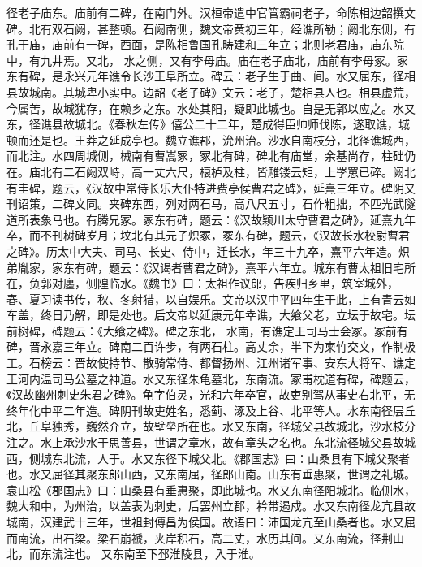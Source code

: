 \documentclass[12pt,UTF8]{ctexbook}
\begin{document}
径老子庙东。庙前有二碑，在南门外。汉桓帝遣中官管霸祠老子，命陈相边韶撰文碑。北有双石阙，甚整顿。石阙南侧，魏文帝黄初三年，经谯所勒；阙北东侧，有孔于庙，庙前有一碑，西面，是陈相鲁国孔畴建和三年立；北则老君庙，庙东院中，有九井焉。又北， 水之侧，又有李母庙。庙在老子庙北，庙前有李母冢。冢东有碑，是永兴元年谯令长沙王阜所立。碑云：老子生于曲、间。水又屈东，径相县故城南。其城卑小实中。边韶《老子碑》文云：老子，楚相县人也。相县虚荒，今属苦，故城犹存，在赖乡之东。水处其阳，疑即此城也。自是无郭以应之。水又东，径谯县故城北。《春秋左传》僖公二十二年，楚成得臣帅师伐陈，遂取谯，城顿而还是也。王莽之延成亭也。魏立谯郡，沇州治。沙水自南枝分，北径谯城西，而北注。水四周城侧，械南有曹嵩冢，冢北有碑，碑北有庙堂，余基尚存，柱础仍在。庙北有二石阙双峙，高一丈六尺，榱栌及柱，皆雕镂云矩，上罦罳已碎。阙北有圭碑，题云，《汉故中常侍长乐大仆特进费亭侯曹君之碑》，延熹三年立。碑阴又刊诏策，二碑文同。夹碑东西，列对两石马，高八尺五寸，石作粗拙，不匹光武隧道所表象马也。有腾兄冢。冢东有碑，题云：《汉故颖川太守曹君之碑》，延熹九年卒，而不刊树碑岁月；坟北有其元子炽冢，冢东有碑，题云，《汉故长水校尉曹君之碑》。历太中大夫、司马、长史、侍中，迁长水，年三十九卒，熹平六年造。炽弟胤家，家东有碑，题云：《汉谒者曹君之碑》，熹平六年立。城东有曹太祖旧宅所在，负郭对廛，侧隍临水。《魏书》曰：太祖作议郎，告疾归乡里，筑室城外，春、夏习读书传，秋、冬射猎，以自娱乐。文帝以汉中平四年生于此，上有青云如车盖，终日乃解，即是处也。后文帝以延康元年幸谯，大飨父老，立坛于故宅。坛前树碑，碑题云：《大飨之碑》。碑之东北， 水南，有谯定王司马士会冢。冢前有碑，晋永嘉三年立。碑南二百许步，有两石柱。高丈余，半下为柬竹交文，作制极工。石榜云：晋故使持节、散骑常侍、都督扬州、江州诸军事、安东大将军、谯定王河内温司马公墓之神道。水又东径朱龟墓北，东南流。冢甫枕道有碑，碑题云，《汉故幽州刺史朱君之碑》。龟字伯灵，光和六年卒官，故吏别驾从事史右北平，无终年化中平二年造。碑阴刊故吏姓名，悉蓟、涿及上谷、北平等人。水东南径层丘北，丘阜独秀，巍然介立，故壁垒所在也。水又东南，径城父县故城北，沙水枝分注之。水上承沙水于思善县，世谓之章水，故有章头之名也。东北流径城父县故城西，侧城东北流，人于。水又东径下城父北。《郡国志》曰：山桑县有下城父聚者也。水又屈径其聚东郎山西，又东南屈，径郎山南。山东有垂惠聚，世谓之礼城。袁山松《郡国志》曰：山桑县有垂惠聚，即此城也。水又东南径阳城北。临侧水，魏大和中，为州治，以盖表为刺史，后罢州立郡，衿带遏戍。水又东南径龙亢县故城南，汉建武十三年，世祖封傅昌为侯国。故语曰：沛国龙亢至山桑者也。水又屈而南流，出石梁。梁石崩褫，夹岸积石，高二丈，水历其间。又东南流，径荆山北，而东流注也。
又东南至下邳淮陵县，入于淮。
\end{document}
